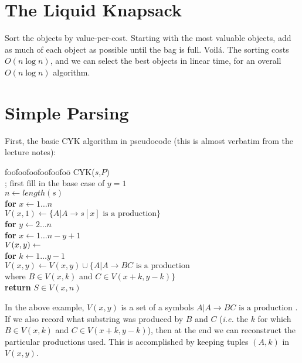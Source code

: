 \documentclass[12pt]{article}
\newenvironment{alg}{
\begin{tabbing}
foo\=foo\=foo\=foo\=foo\=foo\= \kill}
{\end{tabbing}}
\begin{document}
\section{The Liquid Knapsack}

Sort the objects by value-per-cost.  Starting with the most valuable
objects, add as much of each object as possible until the bag is full.
Voil\'a.  The sorting costs $O(n \log n)$, and we can select the best
objects in linear time, for an overall $O(n \log n)$ algorithm.

\section{Simple Parsing}

First, the basic CYK algorithm in pseudocode (this is almost verbatim from
the lecture notes):
\begin{alg}
{\sc CYK}($s$,$P$) \\
\> ; first fill in the base case of $y=1$ \\
\> $n \leftarrow \mathit{length}(s)$ \\ 
\> {\bf for} $x \leftarrow 1 \dots n$ \\
\> \> $V(x,1) \leftarrow \{ A | A \rightarrow s[x] \mbox{ is a production} \}$ \\
\> {\bf for} $y \leftarrow 2 \dots n$ \\
\> \> {\bf for} $x \leftarrow 1 \dots n - y + 1$ \\
\> \> \> $V(x,y) \leftarrow \empty$ \\
\> \> \> {\bf for} $k \leftarrow 1 \dots y - 1$ \\
\> \> \> \> $V(x,y) \leftarrow V(x,y) \cup \{ A | A \rightarrow BC \mbox{ is a production}$ \\
\> \> \> \> \> where $B \in V(x,k)$ and $C \in V(x+k,y-k) \}$ \\
\> {\bf return} $S \in V(x,n)$ 
\end{alg}

In the above example, $V(x,y)$ is a set of a symbols ${A | A\rightarrow BC
\mbox{ is a production } }$.  If we also record what substring was produced
by $B$ and $C$ ({\em i.e.} the $k$ for which $B \in V(x,k)$ and $C \in
V(x+k,y-k)$), then at the end we can reconstruct the particular productions
used.  This is accomplished by keeping tuples $(A,k)$ in $V(x,y)$.
\end{document}

